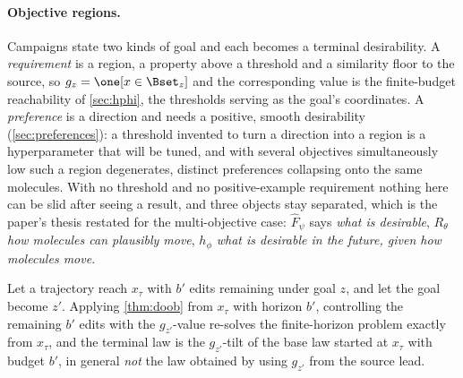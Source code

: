 %
\label{sec:trajectories}

\paragraph{Objective regions.}
\label{sec:regions}
Campaigns state two kinds of goal and each becomes a terminal desirability. A \emph{requirement} is a region, a property above a threshold and a similarity floor to the source, so $g_z=\one[x\in\Bset_z]$ and the corresponding value is the finite-budget reachability of \cref{sec:hphi}, the thresholds serving as the goal's coordinates. A \emph{preference} is a direction and needs a positive, smooth desirability (\cref{sec:preferences}): a threshold invented to turn a direction into a region is a hyperparameter that will be tuned, and with several objectives simultaneously low such a region degenerates, distinct preferences collapsing onto the same molecules.
With no threshold and no positive-example requirement nothing here can be slid after seeing a result, and three objects stay separated, which is the paper's thesis restated for the multi-objective case: $\widehat F_\psi$ says \emph{what is desirable}, $R_\theta$ \emph{how molecules can plausibly move}, $h_\phi$ \emph{what is desirable in the future, given how molecules move}.

\begin{corollary}
\label{cor:retarget}
Let a trajectory reach $x_\tau$ with $b'$ edits remaining under goal $z$, and let the goal become $z'$. Applying \cref{thm:doob} from $x_\tau$ with horizon $b'$, controlling the remaining $b'$ edits with the $g_{z'}$-value re-solves the finite-horizon problem exactly from $x_\tau$, and the terminal law is the $g_{z'}$-tilt of the base law started at $x_\tau$ with budget $b'$, in general \emph{not} the law obtained by using $g_{z'}$ from the source lead.
\end{corollary}

